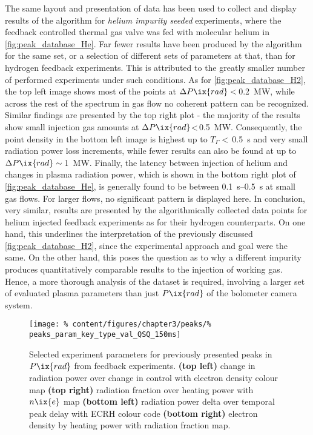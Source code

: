    The same layout and presentation of data has been used to collect and display results of the algorithm for \textit{helium impurity seeded} experiments, where the feedback controlled thermal gas valve was fed with molecular helium in \cref{fig:peak_database_He}. Far fewer results have been produced by the algorithm for the same set, or a selection of different sets of parameters at that, than for hydrogen feedback experiments. This is attributed to the greatly smaller number of performed experiments under such conditions. As for \cref{fig:peak_database_H2}, the top left image shows most of the points at $\Delta P\ix{rad}<$\,\SI{0.2}{\mega\watt}, while across the rest of the spectrum in gas flow no coherent pattern can be recognized. Similar findings are presented by the top right plot - the majority of the results show small injection gas amounts at $\Delta P\ix{rad}$<\,\SI{0.5}{\mega\watt}. Consequently, the point density in the bottom left image is highest up to $T_{\Gamma}<$\,\SI{0.5}{\second} and very small radiation power loss increments, while fewer results can also be found at up to $\Delta P\ix{rad}\sim$\,\SI{1}{\mega\watt}. Finally, the latency between injection of helium and changes in plasma radiation power, which is shown in the bottom right plot of \cref{fig:peak_database_He}, is generally found to be between \SIrange{0.1}{0.5}{\second} at small gas flows. For larger flows, no significant pattern is displayed here. In conclusion, very similar, results are presented by the algorithmically collected data points for helium injected feedback experiments as for their hydrogen counterparts. On one hand, this underlines the interpretation of the previously discussed \cref{fig:peak_database_H2}, since the experimental approach and goal were the same. On the other hand, this poses the question as to why a different impurity produces quantitatively comparable results to the injection of working gas. Hence, a more thorough analysis of the dataset is required, involving a larger set of evaluated plasma parameters than just $P\ix{rad}$ of the bolometer camera system.\\%
%
    \begin{figure}[t]%
        \centering%
        \texttt{[image: \%
            content/figures/chapter3/peaks/\%
            peaks\_param\_key\_type\_val\_QSQ\_150ms]}%
        \caption{Selected experiment parameters for previously presented peaks in $P\ix{rad}$ from feedback experiments. \textbf{(top left)} change in radiation power over change in control with electron density colour map \textbf{(top right)} radiation fraction over heating power with $n\ix{e}$ map \textbf{(bottom left)} radiation power delta over temporal peak delay with ECRH colour code \textbf{(bottom right)} electron density by heating power with radiation fraction map.}\label{fig:peak_parameters_QSQ}%
    \end{figure}%
